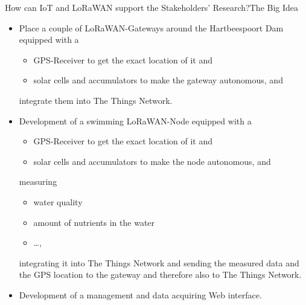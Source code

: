 \begin{frame}{How can \alert{IoT and LoRaWAN} support the Stakeholders' Research?}{The Big Idea}
\begin{description}
\item[Measuring Water Chemistry] \begin{itemize}
    \item Place a couple of LoRaWAN-Gateways around the Hartbeespoort Dam equipped with a
    \begin{itemize}
        \item GPS-Receiver to get the exact location of it and
        \item solar cells and accumulators to make the gateway autonomous, and
    \end{itemize}
    integrate them into The Things Network.
    \item Development of a swimming LoRaWAN-Node equipped with a
    \begin{itemize}
        \item GPS-Receiver to get the exact location of it and
        \item solar cells and accumulators to make the node autonomous, and
    \end{itemize}
    measuring
    \begin{itemize}
        \item water quality
        \item amount of nutrients in the water
        \item \ldots,
    \end{itemize}
    integrating it into The Things Network and sending the measured data and the GPS location to the gateway and therefore also to The Things Network.
    \item Development of a management and data acquiring Web interface.
\end{itemize}
\end{description}
\end{frame}
